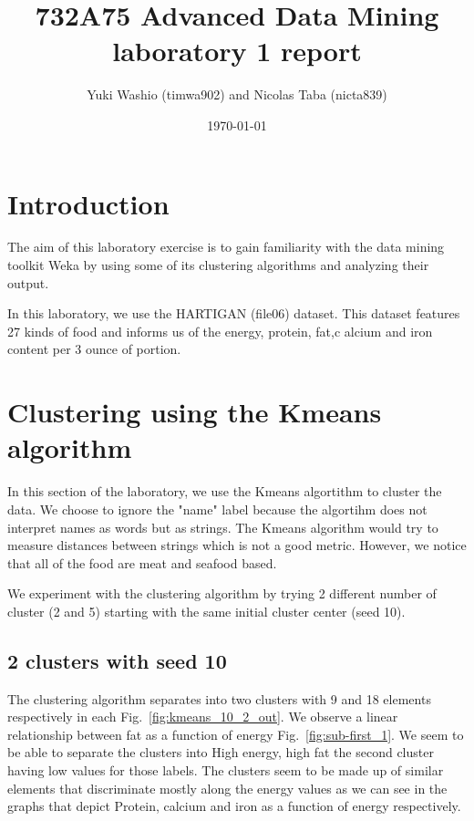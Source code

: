 \documentclass[letterpaper,12pt]{article}
\begin{document}
\title{732A75 Advanced Data Mining laboratory 1 report}
\author{Yuki Washio (timwa902) and Nicolas Taba (nicta839)}
\date{\today}
\maketitle



\section{Introduction}

The aim of this laboratory exercise is to gain familiarity with the data mining toolkit Weka by using some of its clustering algorithms and analyzing their output.

In this laboratory, we use the HARTIGAN (file06) dataset. This dataset features 27 kinds of food and informs us of the energy, protein, fat,c alcium and iron content per 3 ounce of portion.


\section{Clustering using the Kmeans algorithm}

In this section of the laboratory, we use the Kmeans algortithm to cluster the data. We choose to ignore the "name" label because the algortihm does not interpret names as words but as strings. The Kmeans algorithm would try to measure distances between strings which is not a good metric. However, we notice that all of the food are meat and seafood based.

We experiment with the clustering algorithm by trying 2 different number of cluster (2 and 5) starting with the same initial cluster center (seed 10).

\subsection{2 clusters with seed 10}



The clustering algorithm separates into two clusters with 9 and 18 elements respectively in each Fig.~\ref{fig:kmeans_10_2_out}. We observe a linear relationship between fat as a function of energy Fig.~\ref{fig:sub-first_1}. We seem to be able to separate the clusters into High energy, high fat the second cluster having low values for those labels. The clusters seem to be made up of similar elements that discriminate mostly along the energy values as we can see in the graphs that depict Protein, calcium and iron as a function of energy respectively.
\end{document}
